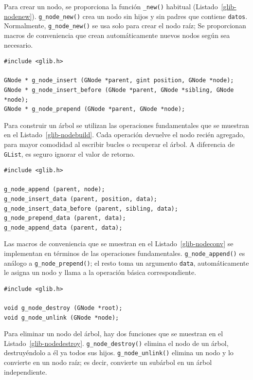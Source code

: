 Para crear un nodo, se proporciona la función \lstinline{_new()} habitual (Listado~\ref{glib-nodenew}). \lstinline{g_node_new()} crea un nodo sin hijos y sin padres que contiene \lstinline{datos}. Normalmente, \lstinline{g_node_new()} se usa solo para crear el nodo raíz; Se proporcionan macros de conveniencia que crean automáticamente nuevos nodos según sea necesario.

\begin{lstlisting}[style=GLib/GTK, caption={Construyendo un árbol \lstinline{GNode}}, label=glib-nodebuild]
#include <glib.h>

GNode * g_node_insert (GNode *parent, gint position, GNode *node);
GNode * g_node_insert_before (GNode *parent, GNode *sibling, GNode *node);
GNode * g_node_prepend (GNode *parent, GNode *node);
\end{lstlisting}

Para construir un árbol se utilizan las operaciones fundamentales que se muestran en el Listado~\ref{glib-nodebuild}. Cada operación devuelve el nodo recién agregado, para mayor comodidad al escribir bucles o recuperar el árbol. A diferencia de \lstinline{GList}, es seguro ignorar el valor de retorno.

\begin{lstlisting}[style=GLib/GTK, caption={Construyendo un \lstinline{GNode}}, label=glib-nodeconv]
#include <glib.h>

g_node_append (parent, node);
g_node_insert_data (parent, position, data);
g_node_insert_data_before (parent, sibling, data);
g_node_prepend_data (parent, data);
g_node_append_data (parent, data);
\end{lstlisting}

Las macros de conveniencia que se muestran en el Listado~\ref{glib-nodeconv} se implementan en términos de las operaciones fundamentales. \lstinline{g_node_append()} es análogo a \lstinline{g_node_prepend()}; el resto toma un argumento \lstinline{data}, automáticamente le asigna un nodo y llama a la operación básica correspondiente.

\begin{lstlisting}[style=GLib/GTK, caption={Destruyendo un \lstinline{GNode}}, label=glib-nodedestroy]
#include <glib.h>

void g_node_destroy (GNode *root);
void g_node_unlink (GNode *node);
\end{lstlisting}

Para eliminar un nodo del árbol, hay dos funciones que se muestran en el Listado~\ref{glib-nodedestroy}. \lstinline{g_node_destroy()} elimina el nodo de un árbol, destruyéndolo a él ya todos sus hijos. \lstinline{g_node_unlink()} elimina un nodo y lo convierte en un nodo raíz; es decir, convierte un subárbol en un árbol independiente.

